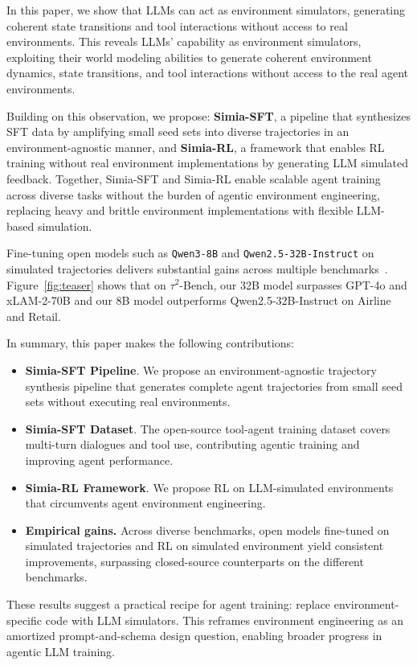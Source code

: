 In this paper, we show that LLMs can act as environment simulators, generating coherent state transitions and tool interactions without access to real environments. This reveals LLMs' capability as environment simulators, exploiting their world modeling abilities to generate coherent environment dynamics, state transitions, and tool interactions without access to the real agent environments.

Building on this observation, we propose: \textbf{Simia-SFT}, a pipeline that synthesizes SFT data by amplifying small seed sets into diverse trajectories in an environment-agnostic manner, and \textbf{Simia-RL}, a framework that enables RL training without real environment implementations by generating LLM simulated feedback. Together, Simia-SFT and Simia-RL enable scalable agent training across diverse tasks without the burden of agentic environment engineering, replacing heavy and brittle environment implementations with flexible LLM-based simulation.



Fine-tuning open models such as \texttt{Qwen3-8B} and \texttt{Qwen2.5-32B-Instruct} on simulated trajectories delivers substantial gains across multiple benchmarks~\citep{wang2024officebench, barres2025tau, liu2023agentbench}. Figure~\ref{fig:teaser} shows that
on $\tau^2$-Bench, our 32B model surpasses GPT-4o and xLAM-2-70B \cite{prabhakar2025apigen} and our 8B model outperforms Qwen2.5-32B-Instruct on Airline and Retail.

In summary, this paper makes the following contributions:
\begin{itemize}[leftmargin=*]
\item \textbf{Simia-SFT Pipeline}. We propose an environment-agnostic trajectory synthesis pipeline that generates complete agent trajectories from small seed sets without executing real environments.
\item \textbf{Simia-SFT Dataset}. The open-source tool-agent training dataset covers multi-turn dialogues and tool use, contributing agentic training and improving agent performance. 
\item \textbf{Simia-RL Framework}. We propose RL on LLM-simulated environments that circumvents agent environment engineering.
\item \textbf{Empirical gains.} Across diverse benchmarks, open models fine-tuned on simulated trajectories and RL on simulated environment yield consistent improvements, surpassing closed-source counterparts on the different benchmarks.
\end{itemize}





These results suggest a practical recipe for agent training: replace environment-specific code with LLM simulators. 
This reframes environment engineering as an amortized prompt-and-schema design question, enabling broader progress in agentic LLM training.
